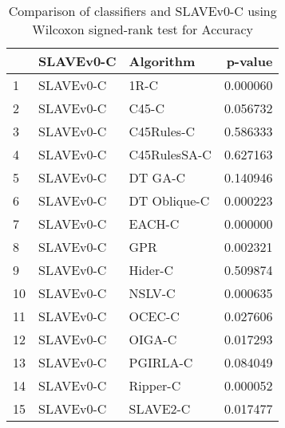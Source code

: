 \begin{table}
\footnotesize
\caption{Comparison of classifiers and SLAVEv0-C using Wilcoxon signed-rank test for Accuracy}
\label{tab:SLAVEv0-C wilcoxon Accuracy comparison}
\begin{tabular}{lllr}
\hline
 & SLAVEv0-C & Algorithm & p-value \\
\hline
1 & SLAVEv0-C & 1R-C & 0.000060 \\
2 & SLAVEv0-C & C45-C & 0.056732 \\
3 & SLAVEv0-C & C45Rules-C & 0.586333 \\
4 & SLAVEv0-C & C45RulesSA-C & 0.627163 \\
5 & SLAVEv0-C & DT GA-C & 0.140946 \\
6 & SLAVEv0-C & DT Oblique-C & 0.000223 \\
7 & SLAVEv0-C & EACH-C & 0.000000 \\
8 & SLAVEv0-C & GPR & 0.002321 \\
9 & SLAVEv0-C & Hider-C & 0.509874 \\
10 & SLAVEv0-C & NSLV-C & 0.000635 \\
11 & SLAVEv0-C & OCEC-C & 0.027606 \\
12 & SLAVEv0-C & OIGA-C & 0.017293 \\
13 & SLAVEv0-C & PGIRLA-C & 0.084049 \\
14 & SLAVEv0-C & Ripper-C & 0.000052 \\
15 & SLAVEv0-C & SLAVE2-C & 0.017477 \\
\hline
\end{tabular}
\end{table}

